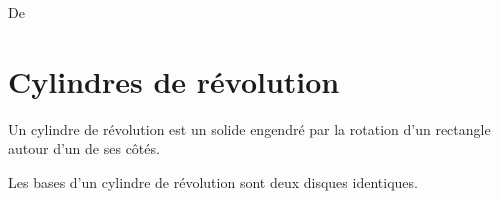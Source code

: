 
De \cite{NRHooXFvgpp5}


\section{Cylindres de révolution}

\begin{definition}
Un cylindre de révolution est un solide engendré par la rotation d'un rectangle autour d'un de ses côtés.
\end{definition}

\begin{propriete}
   Les bases d'un cylindre de révolution sont deux disques identiques.
\end{propriete}



